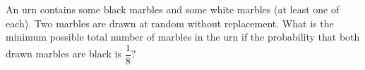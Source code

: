 An urn contains some black marbles and some white marbles (at least one of each). Two marbles are drawn at random without replacement. What is the minimum possible total number of marbles in the urn if the probability that both drawn marbles are black is $\dfrac{1}{8}$?
